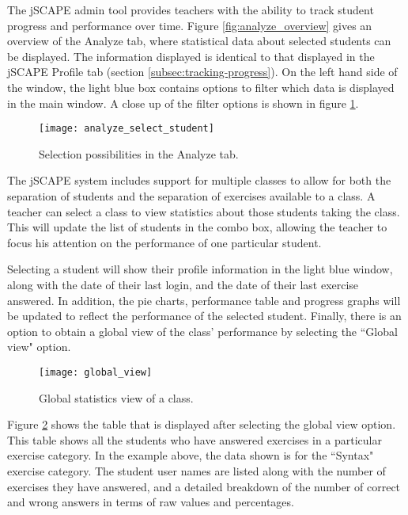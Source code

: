 The jSCAPE admin tool provides teachers with the ability to track student progress and performance over time. Figure \ref{fig:analyze_overview} gives an overview of the Analyze tab, where statistical data about selected students can be displayed. The information displayed is identical to that displayed in the jSCAPE Profile tab (section \ref{subsec:tracking-progress}). On the left hand side of the window, the light blue box contains options to filter which data is displayed in the main window. A close up of the filter options is shown in figure \ref{fig:analyze_select_student}.

\begin{figure}[H]
\centering
\texttt{[image: analyze\_select\_student]}
\caption{Selection possibilities in the Analyze tab.}
\label{fig:analyze_select_student}
\end{figure}

The jSCAPE system includes support for multiple classes to allow for both the separation of students and the separation of exercises available to a class. A teacher can select a class to view statistics about those students taking the class. This will update the list of students in the combo box, allowing the teacher to focus his attention on the performance of one particular student. \newline

Selecting a student will show their profile information in the light blue window, along with the date of their last login, and the date of their last exercise answered. In addition, the pie charts, performance table and progress graphs will be updated to reflect the performance of the selected student. Finally, there is an option to obtain a global view of the class' performance by selecting the ``Global view" option. 

\begin{figure}[H]
\centering
\texttt{[image: global\_view]}
\caption{Global statistics view of a class.}
\label{fig:global_view}
\end{figure}

Figure \ref{fig:global_view} shows the table that is displayed after selecting the global view option. This table shows all the students who have answered exercises in a particular exercise category. In the example above, the data shown is for the ``Syntax" exercise category. The student user names are listed along with the number of exercises they have answered, and a detailed breakdown of the number of correct and wrong answers in terms of raw values and percentages. \newline

